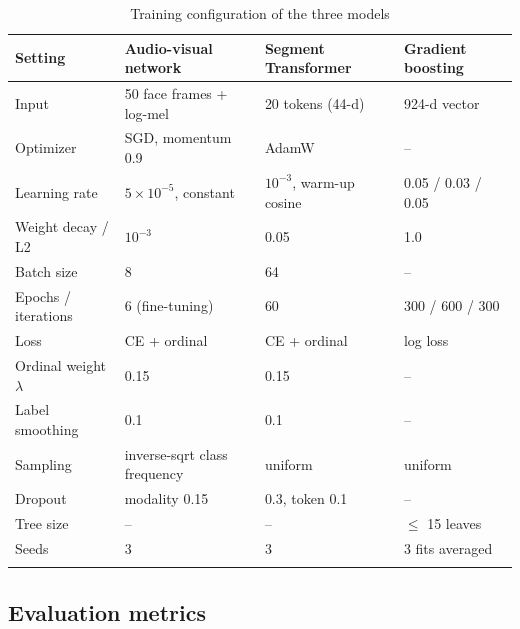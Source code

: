 \documentclass[pdflatex,iicol,sn-basic]{sn-jnl}
\begin{document}
\begin{table}[t]
\caption{Training configuration of the three models}\label{tab:config}
\begin{tabular*}{\textwidth}{@{\extracolsep\fill}llll}
\toprule
Setting & Audio-visual network & Segment Transformer & Gradient boosting\\
\midrule
Input & 50 face frames + log-mel & 20 tokens (44-d) & 924-d vector\\
Optimizer & SGD, momentum 0.9 & AdamW & --\\
Learning rate & $5 \times 10^{-5}$, constant & $10^{-3}$, warm-up cosine & 0.05 / 0.03 / 0.05\\
Weight decay / L2 & $10^{-3}$ & 0.05 & 1.0\\
Batch size & 8 & 64 & --\\
Epochs / iterations & 6 (fine-tuning) & 60 & 300 / 600 / 300\\
Loss & CE + ordinal & CE + ordinal & log loss\\
Ordinal weight $\lambda$ & 0.15 & 0.15 & --\\
Label smoothing & 0.1 & 0.1 & --\\
Sampling & inverse-sqrt class frequency & uniform & uniform\\
Dropout & modality 0.15 & 0.3, token 0.1 & --\\
Tree size & -- & -- & $\le$ 15 leaves\\
Seeds & 3 & 3 & 3 fits averaged\\
\botrule
\end{tabular*}
\end{table}

\subsection{Evaluation metrics}\label{sec:metrics}
\end{document}
